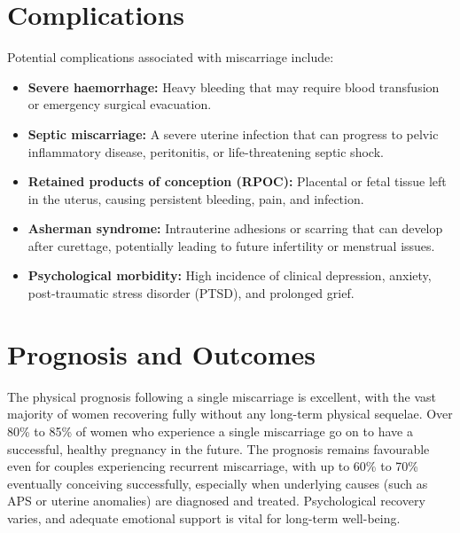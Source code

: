 \section*{Complications}
Potential complications associated with miscarriage include:
\begin{itemize}
    \item \textbf{Severe haemorrhage:} Heavy bleeding that may require blood transfusion or emergency surgical evacuation.
    \item \textbf{Septic miscarriage:} A severe uterine infection that can progress to pelvic inflammatory disease, peritonitis, or life-threatening septic shock.
    \item \textbf{Retained products of conception (RPOC):} Placental or fetal tissue left in the uterus, causing persistent bleeding, pain, and infection.
    \item \textbf{Asherman syndrome:} Intrauterine adhesions or scarring that can develop after curettage, potentially leading to future infertility or menstrual issues.
    \item \textbf{Psychological morbidity:} High incidence of clinical depression, anxiety, post-traumatic stress disorder (PTSD), and prolonged grief.
\end{itemize}

\section*{Prognosis and Outcomes}
The physical prognosis following a single miscarriage is excellent, with the vast majority of women recovering fully without any long-term physical sequelae. Over 80\% to 85\% of women who experience a single miscarriage go on to have a successful, healthy pregnancy in the future. The prognosis remains favourable even for couples experiencing recurrent miscarriage, with up to 60\% to 70\% eventually conceiving successfully, especially when underlying causes (such as APS or uterine anomalies) are diagnosed and treated. Psychological recovery varies, and adequate emotional support is vital for long-term well-being.

